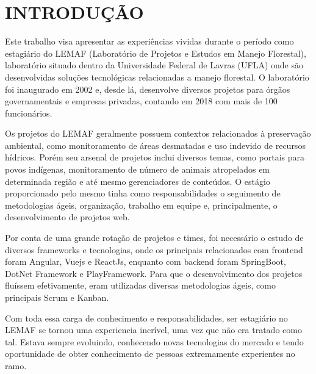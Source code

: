 \chapter{INTRODUÇÃO}
\label{cap:introducao}

Este trabalho visa apresentar as experiências vividas durante o período como estagiário do LEMAF (Laboratório de Projetos e Estudos
em Manejo Florestal), laboratório situado dentro da Universidade Federal de Lavras (UFLA) onde são desenvolvidas soluções tecnológicas relacionadas a manejo florestal.
O laboratório foi inaugurado em 2002 e, desde lá, desenvolve diversos projetos para órgãos governamentais e empresas privadas, contando em 2018 com mais de 100 funcionários.

Os projetos do LEMAF geralmente possuem contextos relacionados à preservação ambiental, como monitoramento de áreas desmatadas e uso indevido de recursos hídricos. Porém seu arsenal de projetos inclui diversos temas, como portais para povos indígenas, monitoramento de número de animais atropelados em determinada região e até mesmo gerenciadores de conteúdos.   
O estágio proporcionado pelo mesmo tinha como responsabilidades o seguimento de metodologias ágeis, organização, trabalho em equipe e, principalmente, o desenvolvimento de projetos web.

Por conta de uma grande rotação de projetos e times, foi necessário o estudo de diversos frameworks e tecnologias, onde os principais relacionados com frontend foram Angular, Vuejs e ReactJs, enquanto com backend foram SpringBoot, DotNet Framework e PlayFramework.
Para que o desenvolvimento dos projetos fluíssem efetivamente, eram utilizadas diversas metodologias ágeis, como principais Scrum e Kanban.

Com toda essa carga de conhecimento e responsabilidades, ser estagiário no LEMAF se tornou uma experiencia incrível, uma vez que não era tratado como tal. Estava sempre evoluindo, conhecendo novas tecnologias do mercado e tendo oportunidade de obter conhecimento de pessoas extremamente experientes no ramo.